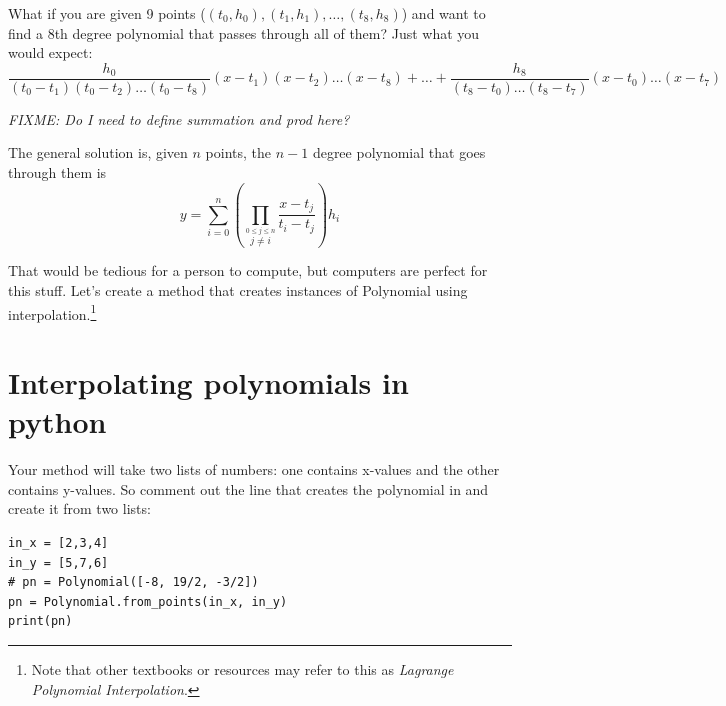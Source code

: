 What if you are given 9 points ($(t_0, h_0), (t_1, h_1), \ldots, (t_8,
h_8)$) and want to find a 8th degree polynomial that passes through
all of them? Just what you would expect:
\begin{equation*}
\frac{h_0}{(t_0 - t_1)(t_0 - t_2)\ldots(t_0 - t_8)}(x - t_1)(x - t_2)\ldots(x - t_8) + \ldots + \frac{h_8}{(t_8 - t_0)\ldots(t_8-t_7)}(x - t_0)\dots(x - t_7)
\end{equation*}

\textit{FIXME: Do I need to define summation and prod here?}

The general solution is, given $n$ points, the $n-1$ degree polynomial that goes through them is
\begin{equation*}
  y =\sum_{i=0}^{n}\left ( \prod_{\stackrel{\!0\leq j\leq n}{j\neq i}}\frac{x-t_j}{t_i-t_j}\right ) h_i
\end{equation*}

That would be tedious for a person to compute, but computers are perfect for this
stuff. Let's create a method that creates instances of Polynomial
using interpolation.\footnote{Note that other textbooks or resources may refer to this as \textit{Lagrange Polynomial Interpolation}.}

\section{Interpolating polynomials in python}

Your method will take two lists of numbers: one contains x-values and
the other contains y-values. So comment out the line that creates the
polynomial in  and create it from two lists:
\begin{verbatim}
in_x = [2,3,4]
in_y = [5,7,6]
# pn = Polynomial([-8, 19/2, -3/2])
pn = Polynomial.from_points(in_x, in_y)
print(pn)
\end{verbatim}

